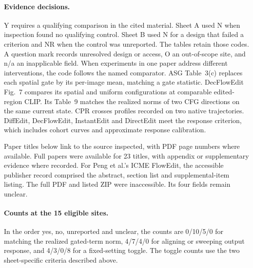 \paragraph{Evidence decisions.} Y requires a qualifying comparison in the cited material. Sheet A used N when inspection found no qualifying control. Sheet B used N for a design that failed a criterion and NR when the control was unreported. The tables retain those codes. A question mark records unresolved design or access, O an out-of-scope site, and n/a an inapplicable field. When experiments in one paper address different interventions, the code follows the named comparator. ASG Table~3(c) replaces each spatial gate by its per-image mean, matching a gate statistic. DecFlowEdit Fig.~7 compares its spatial and uniform configurations at comparable edited-region CLIP. Its Table~9 matches the realized norms of two CFG directions on the same current state. CPR crosses profiles recorded on two native trajectories. DiffEdit, DecFlowEdit, InstantEdit and DirectEdit meet the response criterion, which includes cohort curves and approximate response calibration.

Paper titles below link to the source inspected, with PDF page numbers where available. Full papers were available for 23 titles, with appendix or supplementary evidence where recorded. For Peng et al.'s ICME FlowEdit, the accessible publisher record comprised the abstract, section list and supplemental-item listing. The full PDF and listed ZIP were inaccessible. Its four fields remain unclear.

\paragraph{Counts at the 15 eligible sites.} In the order yes, no, unreported and unclear, the counts are 0/10/5/0 for matching the realized gated-term norm, 4/7/4/0 for aligning or sweeping output response, and 4/3/0/8 for a fixed-setting toggle. The toggle counts use the two sheet-specific criteria described above.

